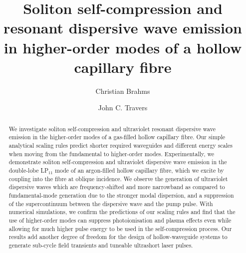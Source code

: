 \documentclass[amsmath, preprint, floatfix]{revtex4-2}
\begin{document}
\title{Soliton self-compression and resonant dispersive wave emission in higher-order modes of a hollow capillary fibre}

\author{Christian Brahms}
\author{John C. Travers}

\begin{abstract}
We investigate soliton self-compression and ultraviolet resonant dispersive wave emission in the higher-order modes of a gas-filled hollow capillary fibre. Our simple analytical scaling rules predict shorter required waveguides and different energy scales when moving from the fundamental to higher-order modes. Experimentally, we demonstrate soliton self-compression and ultraviolet dispersive wave emission in the double-lobe LP$_{11}$ mode of an argon-filled hollow capillary fibre, which we excite by coupling into the fibre at oblique incidence. We observe the generation of ultraviolet dispersive waves which are frequency-shifted and more narrowband as compared to fundamental-mode generation due to the stronger modal dispersion, and a suppression of the supercontinuum between the dispersive wave and the pump pulse. With numerical simulations, we confirm the predictions of our scaling rules and find that the use of higher-order modes can suppress photoionisation and plasma effects even while allowing for much higher pulse energy to be used in the self-compression process. Our results add another degree of freedom for the design of hollow-waveguide systems to generate sub-cycle field transients and tuneable ultrashort laser pulses.
\end{abstract}

\maketitle
\end{document}
